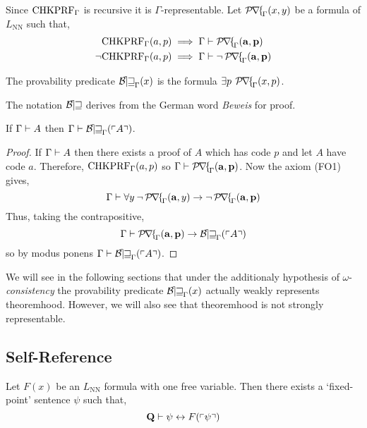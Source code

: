 \documentclass[12pt]{article}
\newcommand{\uq}[1]{\forall{#1} \:}
\renewcommand{\eq}[1]{\exists{#1} \:}
\begin{document}
\begin{definition}
Since $\mathrm{CHKPRF}_{\Gamma}$ is recursive it is $\Gamma$-representable. Let $\operatorname{\mathcal{P\mkern-2mu r\mkern-2.5mu f\mkern-2mu}}_{\Gamma}(x,y)$ be a formula of $L_{\text{NN}}$ such that,
\begin{align*}
\mathrm{CHKPRF}_{\Gamma}(a,p) & \implies \Gamma \vdash \operatorname{\mathcal{P\mkern-2mu r\mkern-2.5mu f\mkern-2mu}}_{\Gamma}(\mathbf{a}, \mathbf{p})
\\
\neg \mathrm{CHKPRF}_{\Gamma}(a,p) & \implies \Gamma \vdash \neg \operatorname{\mathcal{P\mkern-2mu r\mkern-2.5mu f\mkern-2mu}}_{\Gamma}(\mathbf{a}, \mathbf{p})
\end{align*}
\end{definition}

\begin{definition}
The provability predicate $\operatorname{\mathcal{B\mkern-2.0mu e\mkern-2.0mu w\mkern-1mu}}_\Gamma(x)$ is the formula $\eq{p}\Prf_{\Gamma}(x, p)$.
\end{definition}

\begin{remark}
The notation $\operatorname{\mathcal{B\mkern-2.0mu e\mkern-2.0mu w\mkern-1mu}}$ derives from the German word \textit{Beweis} for proof. 
\end{remark}

\begin{lemma}
If $\Gamma \vdash A$ then $\Gamma \vdash \operatorname{\mathcal{B\mkern-2.0mu e\mkern-2.0mu w\mkern-1mu}}_{\Gamma}(\left\ulcorner A \right\urcorner)$.
\end{lemma}

\begin{proof}
If $\Gamma \vdash A$ then there exists a proof of $A$ which has code $p$ and let $A$ have code $a$. Therefore, $\mathrm{CHKPRF}_{\Gamma}(a,p)$ so $\Gamma \vdash \operatorname{\mathcal{P\mkern-2mu r\mkern-2.5mu f\mkern-2mu}}_{\Gamma}(\mathbf{a}, \mathbf{p})$. Now the axiom (FO1) gives, 
\[ \Gamma \proves \uq{y} \neg \Prf_{\Gamma}(\bf{a}, y) \to \neg \Prf_{\Gamma}(\bf{a}, \bf{p}) \] 
Thus, taking the contrapositive, 
\[ \Gamma \vdash \operatorname{\mathcal{P\mkern-2mu r\mkern-2.5mu f\mkern-2mu}}_{\Gamma}(\mathbf{a}, \mathbf{p}) \to \operatorname{\mathcal{B\mkern-2.0mu e\mkern-2.0mu w\mkern-1mu}}_{\Gamma}(\left\ulcorner A \right\urcorner) \]
so by modus ponens $\Gamma \vdash \operatorname{\mathcal{B\mkern-2.0mu e\mkern-2.0mu w\mkern-1mu}}_{\Gamma}(\left\ulcorner A \right\urcorner)$. 
\end{proof}

\begin{remark}
We will see in the following sections that under the additionaly hypothesis of $\omega$-\textit{consistency} the provability predicate $\operatorname{\mathcal{B\mkern-2.0mu e\mkern-2.0mu w\mkern-1mu}}_\Gamma(x)$ actually weakly represents theoremhood. However, we will also see that theoremhood is not strongly representable.
\end{remark}

\subsection{Self-Reference}

\begin{lemma}[Diagonalization]
Let $F(x)$ be an $L_{\mathrm{NN}}$ formula with one free variable. Then there exists a `fixed-point' sentence $\psi$ such that,
\[ \mathbf{Q} \vdash \psi \leftrightarrow F(\left\ulcorner \psi \right\urcorner) \]
\end{lemma}
\end{document}
